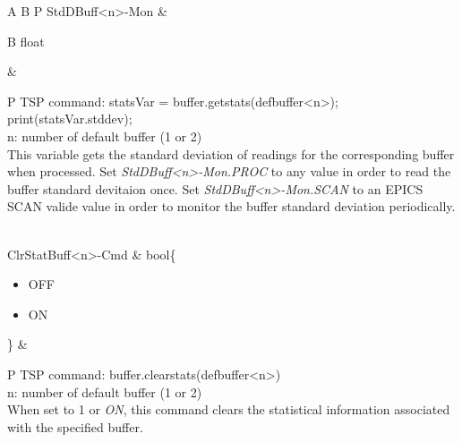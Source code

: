 \documentclass[openany]{article}
\begin{document}
\begin{longtable}{A B P}
		StdDBuff\textless n\textgreater-Mon & \begin{tabular}{B}
					float
				\end{tabular} & 
				\begin{tabular}{P}
					TSP command: statsVar = buffer.getstats(defbuffer\textless n\textgreater); print(statsVar.stddev); \\
					n: number of default buffer (1 or 2) \\
					This variable gets the standard deviation of readings for the corresponding buffer when processed. Set \emph{StdDBuff\textless n\textgreater-Mon.PROC} to any value in order to read the buffer standard devitaion once. Set \emph{StdDBuff\textless n\textgreater-Mon.SCAN} to an EPICS SCAN valide value in order to monitor the buffer standard deviation periodically.
				\end{tabular} \\ \hline
		ClrStatBuff\textless n\textgreater-Cmd & bool\{\begin{itemize}[noitemsep]
					\small
					\item[] OFF
					\item[] ON
				\end{itemize}\} & 
				\begin{tabular}{P}
					TSP command: buffer.clearstats(defbuffer\textless n\textgreater) \\
					n: number of default buffer (1 or 2) \\
					When set to 1 or \emph{ON}, this command clears the statistical information associated with the specified buffer.
				\end{tabular} \\
	\end{longtable}
\end{document}
